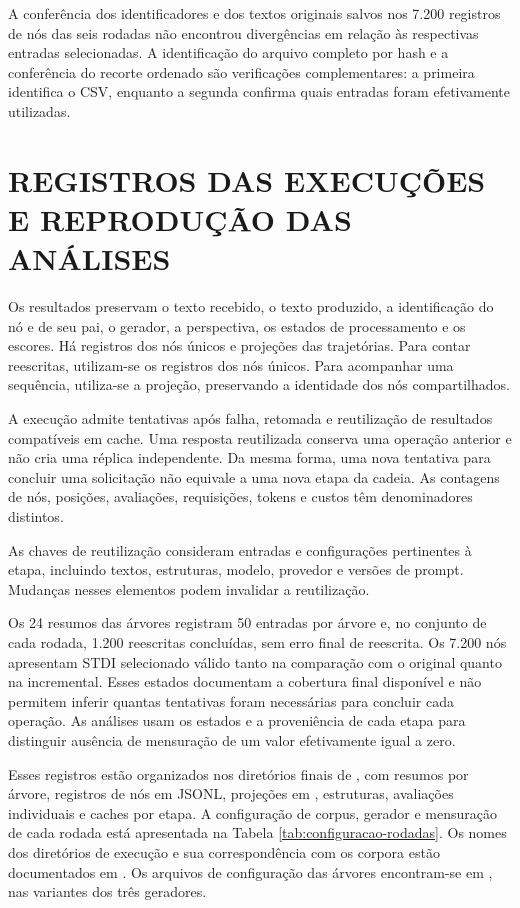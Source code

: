 A conferência dos identificadores e dos textos originais salvos nos 7.200 registros de nós das seis rodadas não encontrou divergências em relação às respectivas entradas selecionadas. A identificação do arquivo completo por hash e a conferência do recorte ordenado são verificações complementares: a primeira identifica o CSV, enquanto a segunda confirma quais entradas foram efetivamente utilizadas.

\section{REGISTROS DAS EXECUÇÕES E REPRODUÇÃO DAS ANÁLISES}

Os resultados preservam o texto recebido, o texto produzido, a identificação do nó e de seu pai, o gerador, a perspectiva, os estados de processamento e os escores. Há registros dos nós únicos e projeções das trajetórias. Para contar reescritas, utilizam-se os registros dos nós únicos. Para acompanhar uma sequência, utiliza-se a projeção, preservando a identidade dos nós compartilhados.

A execução admite tentativas após falha, retomada e reutilização de resultados compatíveis em cache. Uma resposta reutilizada conserva uma operação anterior e não cria uma réplica independente. Da mesma forma, uma nova tentativa para concluir uma solicitação não equivale a uma nova etapa da cadeia. As contagens de nós, posições, avaliações, requisições, tokens e custos têm denominadores distintos.

As chaves de reutilização consideram entradas e configurações pertinentes à etapa, incluindo textos, estruturas, modelo, provedor e versões de prompt. Mudanças nesses elementos podem invalidar a reutilização.

Os 24 resumos das árvores registram 50 entradas por árvore e, no conjunto de cada rodada, 1.200 reescritas concluídas, sem erro final de reescrita. Os 7.200 nós apresentam STDI selecionado válido tanto na comparação com o original quanto na incremental. Esses estados documentam a cobertura final disponível e não permitem inferir quantas tentativas foram necessárias para concluir cada operação. As análises usam os estados e a proveniência de cada etapa para distinguir ausência de mensuração de um valor efetivamente igual a zero.

Esses registros estão organizados nos diretórios finais de , com resumos por árvore, registros de nós em JSONL, projeções em , estruturas, avaliações individuais e caches por etapa. A configuração de corpus, gerador e mensuração de cada rodada está apresentada na Tabela \ref{tab:configuracao-rodadas}. Os nomes dos diretórios de execução e sua correspondência com os corpora estão documentados em . Os arquivos de configuração das árvores encontram-se em , nas variantes dos três geradores.

